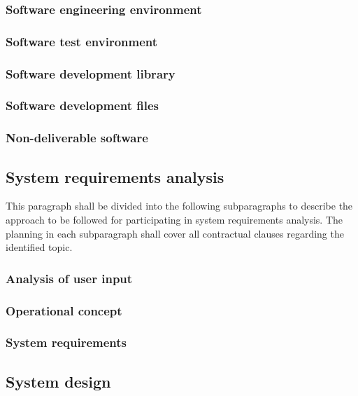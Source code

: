 \documentclass{fidata-report-template}
\begin{document}
\subsubsection{Software engineering environment}

\subsubsection{Software test environment}

\subsubsection{Software development library}

\subsubsection{Software development files}

\subsubsection{Non-deliverable software}

\subsection{System requirements analysis}

This paragraph shall be divided into the following subparagraphs to
describe the approach to be followed for participating in system
requirements analysis. The planning in each subparagraph shall cover all
contractual clauses regarding the identified topic.

\subsubsection{Analysis of user input}

\subsubsection{Operational concept}

\subsubsection{System requirements}

\subsection{System design}
\end{document}

